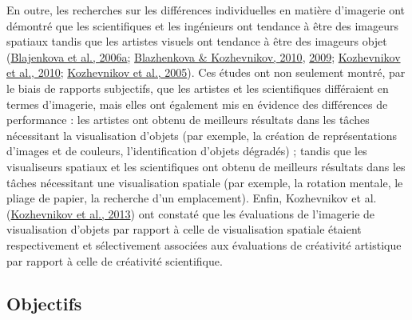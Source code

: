 \documentclass[
  12pt,
]{article}
\begin{document}
En outre, les recherches sur les différences individuelles en matière
d'imagerie ont démontré que les scientifiques et les ingénieurs ont
tendance à être des imageurs spatiaux tandis que les artistes visuels
ont tendance à être des imageurs objet
(\protect\hyperlink{ref-blajenkovaObjectSpatialImagery2006}{Blajenkova
et al., 2006a};
\protect\hyperlink{ref-blazhenkovaVisualobjectAbilityNew2010}{Blazhenkova
\& Kozhevnikov, 2010},
\protect\hyperlink{ref-blazhenkovaNewObjectspatialverbalCognitive2009}{2009};
\protect\hyperlink{ref-kozhevnikovTradeoffObjectSpatial2010}{Kozhevnikov
et al., 2010};
\protect\hyperlink{ref-kozhevnikovSpatialObjectVisualizers2005}{Kozhevnikov
et al., 2005}). Ces études ont non seulement montré, par le biais de
rapports subjectifs, que les artistes et les scientifiques différaient
en termes d'imagerie, mais elles ont également mis en évidence des
différences de performance : les artistes ont obtenu de meilleurs
résultats dans les tâches nécessitant la visualisation d'objets (par
exemple, la création de représentations d'images et de couleurs,
l'identification d'objets dégradés) ; tandis que les visualiseurs
spatiaux et les scientifiques ont obtenu de meilleurs résultats dans les
tâches nécessitant une visualisation spatiale (par exemple, la rotation
mentale, le pliage de papier, la recherche d'un emplacement). Enfin,
Kozhevnikov et al.
(\protect\hyperlink{ref-kozhevnikovCreativityVisualizationAbilities2013}{Kozhevnikov
et al., 2013}) ont constaté que les évaluations de l'imagerie de
visualisation d'objets par rapport à celle de visualisation spatiale
étaient respectivement et sélectivement associées aux évaluations de
créativité artistique par rapport à celle de créativité scientifique.

\hypertarget{objectifs}{%
\subsection{Objectifs}\label{objectifs}}
\end{document}
